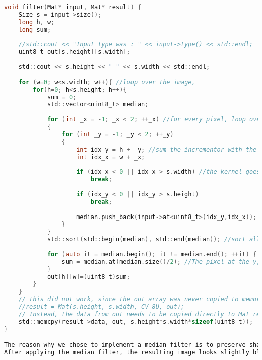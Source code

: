 \begin{lstlisting}[language=C, caption=Noise correction filter, label=lst:noise_filter]
void filter(Mat* input, Mat* result) {
    Size s = input->size();
    long h, w;
    long sum;
    
    //std::cout << "Input type was : " << input->type() << std::endl;
    uint8_t out[s.height][s.width];
    
    std::cout << s.height << " " << s.width << std::endl;
    
    for (w=0; w<s.width; w++){ //loop over the image, 
        for(h=0; h<s.height; h++){
            sum = 0;
            std::vector<uint8_t> median;
            
            for (int _x = -1; _x < 2; ++_x) //for every pixel, loop over every pixel in a 3x3 kernel
            {
                for (int _y = -1; _y < 2; ++_y)
                {
                    int idx_y = h + _y; //sum the incrementor with the kernel's, so we can identify borders
                    int idx_x = w + _x;
                    
                    if (idx_x < 0 || idx_x > s.width) //the kernel goes outside of the image, therefore break and ignore that pixel.
                        break;
                        
                    if (idx_y < 0 || idx_y > s.height)
                        break;
                    
                    median.push_back(input->at<uint8_t>(idx_y,idx_x)); // Add all the pixels from the kernel into a vector
                }
            }
            std::sort(std::begin(median), std::end(median)); //sort all pixel values from high to low
                    
            for (auto it = median.begin(); it != median.end(); ++it) {
                sum = median.at(median.size()/2); //The pixel at the y,x coordinate is now the median from our 3x3 sliding window
            }
            out[h][w]=(uint8_t)sum;
        }
    }
    // this did not work, since the out array was never copied to memory, causing image data pointing to nowhere!
    //result = Mat(s.height, s.width, CV_8U, out); 
    // Instead, the data from out needs to be copied directly to Mat result with the correct size
    std::memcpy(result->data, out, s.height*s.width*sizeof(uint8_t));
}

The reason why we chose to implement a median filter is to preserve sharp edges to minimize loss of detail on the object, whereas a Gaussian or mean filter would blur sharp edges. In our code, a 3x3 sliding window is ran over the image, and the center pixel is replaced with the median of the window. The pixel values from the kernel are pushed back into a std::vector, this allows us to use STL library operations like std::sort to order the values.
After applying the median filter, the resulting image looks slightly blurred, but sharp transitions are mostly preserved. Note that the 1px wide text at the top of the image is partially removed. This is due to the nature of a median filter and is very challanging to preserve.

\end{lstlisting}


